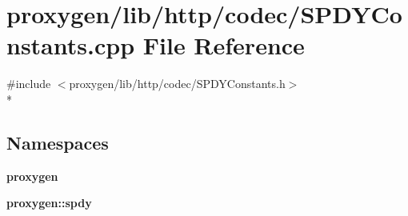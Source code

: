 \section{proxygen/lib/http/codec/\+S\+P\+D\+Y\+Constants.cpp File Reference}
\label{SPDYConstants_8cpp}
{\ttfamily \#include $<$proxygen/lib/http/codec/\+S\+P\+D\+Y\+Constants.\+h$>$}\\*
\subsection*{Namespaces}
\begin{DoxyCompactItemize}
\item 
 {\bf proxygen}
\item 
 {\bf proxygen\+::spdy}
\end{DoxyCompactItemize}

